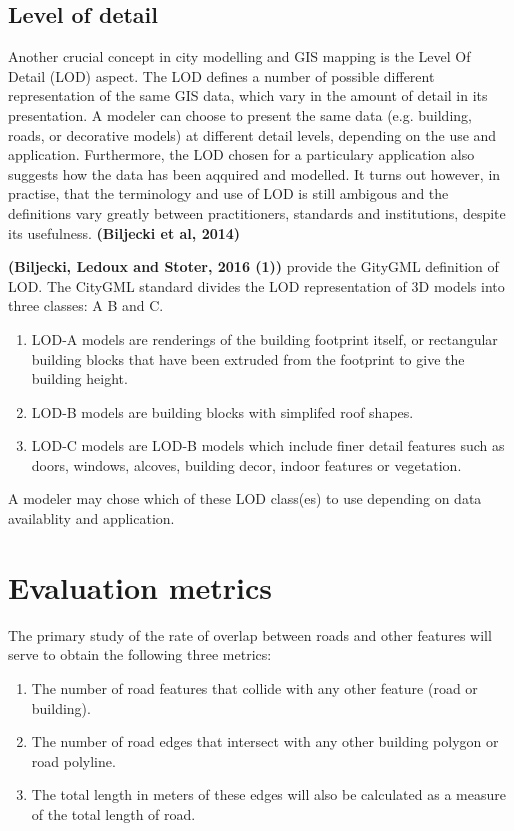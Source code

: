\documentclass{kththesis}
\begin{document}
\subsection{Level of detail}

Another crucial concept in city modelling and GIS mapping is the Level Of Detail (LOD) aspect.
The LOD defines a number of possible different representation of the same GIS data, which vary in the amount of detail in its presentation.
A modeler can choose to present the same data (e.g. building, roads, or decorative models) at different detail levels, depending on the use and application.
Furthermore, the LOD chosen for a particulary application also suggests how the data has been aqquired and modelled.
It turns out however, in practise, that the terminology and use of LOD is still ambigous and the definitions vary greatly between practitioners, standards and institutions, despite its usefulness.
\textbf{(Biljecki et al, 2014)}

\textbf{(Biljecki, Ledoux and Stoter, 2016 (1))} provide the GityGML definition of LOD.
The CityGML standard divides the LOD representation of 3D models into three classes: A B and C.
\begin{enumerate}
    \item LOD-A models are renderings of the building footprint itself, or rectangular building blocks that have been extruded from the footprint to give the building height.
    \item LOD-B models are building blocks with simplifed roof shapes.
    \item LOD-C models are LOD-B models which include finer detail features such as doors, windows, alcoves, building decor, indoor features or vegetation.
\end{enumerate}
A modeler may chose which of these LOD class(es) to use depending on data availablity and application.

\section{Evaluation metrics}

The primary study of the rate of overlap between roads and other features will serve to obtain the following three metrics:

\begin{enumerate}
    \item The number of road features that collide with any other feature (road or building).
    \item The number of road edges that intersect with any other building polygon or road polyline.
    \item The total length in meters of these edges will also be calculated as a measure of the total length of road.
\end{enumerate}
\end{document}
